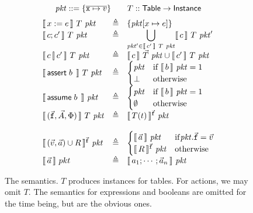 

\begin{figure}
  \[\mathit{pkt} :: = \{\overline{\texttt{x} \mapsto v}\}\qquad T :: \mathsf{Table} \to \mathsf{Instance}\]
  \[\begin{array}{lcl}
      \llbracket\,x:=e\,\rrbracket~T~\mathit{pkt} &\triangleq& \{\mathit{pkt}[x \mapsto e]\} \\
      \llbracket\,c;c'\,\rrbracket~T~\mathit{pkt} & \triangleq& \displaystyle \bigcup_{\mathit{pkt}' \in \llbracket\,c'\,\rrbracket~T~\mathit{pkt}}\llbracket\,c\,\rrbracket~T~\mathit{pkt}' \\
      \llbracket\,c\operatorname*{\left[\!\right]} c'\,\rrbracket~T~\mathit{pkt} & \triangleq & \llbracket\,c\,\rrbracket~\vec T~\mathit{pkt} \cup \llbracket\,c'\,\rrbracket~T~\mathit{pkt}\\
      \llbracket\,\mathsf{assert}\; b\;\,\rrbracket~T~\mathit{pkt} & \triangleq & \begin{cases}
        \mathit{pkt} & \textrm{if}~\llbracket\,b\,\rrbracket~\mathit{pkt} = 1 \\
        \bot & \textrm{otherwise}
      \end{cases} \\
      \llbracket\,\mathsf{assume}\; b\;\,\rrbracket~\mathit{pkt} & \triangleq & \begin{cases}
        \mathit{pkt} & \textrm{if}~\llbracket\,b\,\rrbracket~\mathit{pkt} = 1 \\
        \emptyset & \textrm{otherwise}
      \end{cases} \\
      \llbracket\,(\vec{\texttt{f}}, \vec A, \Phi)\,\rrbracket~T~\mathit{pkt} &\triangleq & \llbracket\,T(t)\,\rrbracket^{\vec{\texttt{f}}}~\mathit{pkt} \\\\
      \llbracket\,(\vec v, \vec a)\cup R\,\rrbracket^{\vec{\texttt{f}}}~\mathit{pkt} & \triangleq & \begin{cases}
        \llbracket\,\vec a\,\rrbracket~\mathit{pkt} & \mathrm{if} \mathit{pkt}.\vec{\texttt{f}} = \vec v\\
        \llbracket\,R\,\rrbracket^{\vec{\texttt{f}}}~\mathit{pkt}& \mathrm{otherwise}
        \end{cases}                                                            
      \\
      \llbracket\,\vec a\,\rrbracket~pkt & \triangleq & \llbracket\,a_1;\cdots;\vec a_n\,\rrbracket~\mathit{pkt}
    \end{array}
  \]

  \caption{The semantics. $T$ produces instances for tables. For
    actions, we may omit $T$. The semantics for expressions and
    booleans are omitted for the time being, but are the obvious
    ones.}
  \label{fig:semantics}
\end{figure}